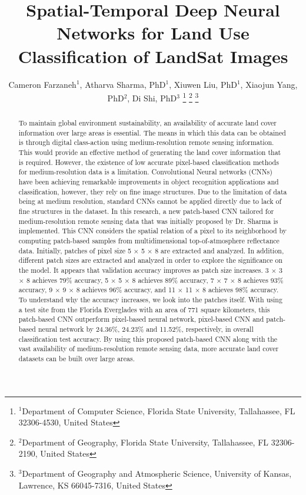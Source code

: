\documentclass[letterpaper, 10 pt, conference]{ieeeconf}  %
\title{\LARGE \bf
Spatial-Temporal Deep Neural Networks for Land Use Classification of LandSat Images
}
\author{Cameron Farzaneh$^{1}$, Atharva Sharma, PhD$^{1}$, Xiuwen Liu, PhD$^{1}$, Xiaojun Yang, PhD$^{2}$, Di Shi, PhD$^{3}$%
\thanks{$^{1}$Department of Computer Science, Florida State University, Tallahassee, FL 32306-4530, United States}%
\thanks{$^{2}$Department of Geography, Florida State University, Tallahassee, FL 32306-2190, United States}%
\thanks{$^{3}$Department of Geography and Atmospheric Science, University of Kansas, Lawrence, KS 66045-7316, United States}%
}
\begin{document}
\maketitle
\thispagestyle{empty}
\pagestyle{empty}


\begin{abstract}

To maintain global environment sustainability, an availability of accurate land cover information over large areas is essential. The means in which this data can be obtained is through digital class-action using medium-resolution remote sensing information. This would provide an effective method of generating the land cover information that is required. However, the existence of low accurate pixel-based classification methods for medium-resolution data is a limitation. Convolutional Neural networks (CNNs) have been achieving remarkable improvements in object recognition applications and classification, however, they rely on fine image structures. Due to the limitation of data being at medium resolution, standard CNNs cannot be applied directly due to lack of fine structures in the dataset. In this research, a new patch-based CNN tailored for medium-resolution remote sensing data that was initially proposed by Dr. Sharma is implemented. This CNN considers the spatial relation of a pixel to its neighborhood by computing patch-based samples from multidimensional top-of-atmosphere reflectance data. Initially, patches of pixel size 5 $\times$ 5 $\times$ 8 are extracted and analyzed. In addition, different patch sizes are extracted and analyzed in order to explore the significance on the model. It appears that validation accuracy improves as patch size increases. 3 $\times$ 3 $\times$ 8 achieves 79\% accuracy, 5 $\times$ 5 $\times$ 8 achieves 89\% accuracy, 7 $\times$ 7 $\times$ 8 achieves 93\% accuracy, 9 $\times$ 9 $\times$ 8 achieves 96\% accuracy, and 11 $\times$ 11 $\times$ 8 achieves 98\% accuracy. To understand why the accuracy increases, we look into the patches itself. With using a test site from the Florida Everglades with an area of 771 square kilometers, this patch-based CNN outperform pixel-based neural network, pixel-based CNN and patch-based neural network by 24.36\%, 24.23\% and 11.52\%, respectively, in overall classification test accuracy. By using this proposed patch-based CNN along with the vast availability of medium-resolution remote sensing data, more accurate land cover datasets can be built over large areas.

\end{abstract}
\end{document}

